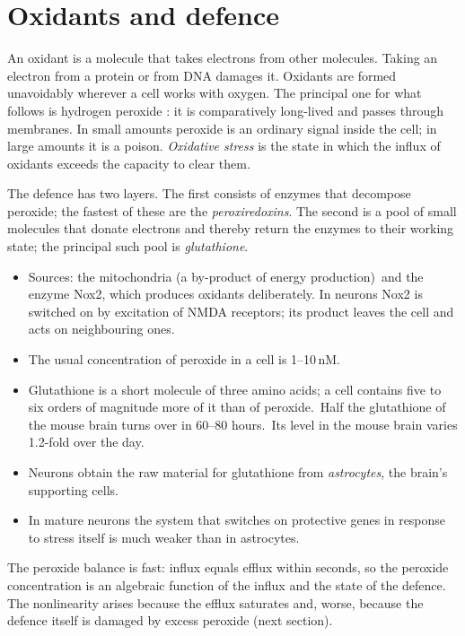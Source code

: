 \section{Oxidants and defence}\label{sec:redox}
An oxidant is a molecule that takes electrons from other molecules. Taking an electron from a protein or from DNA damages it. Oxidants are formed unavoidably wherever a cell works with oxygen. The principal one for what follows is hydrogen peroxide \Hp: it is comparatively long-lived and passes through membranes. In small amounts peroxide is an ordinary signal inside the cell; in large amounts it is a poison. \emph{Oxidative stress} is the state in which the influx of oxidants exceeds the capacity to clear them.

The defence has two layers. The first consists of enzymes that decompose peroxide; the fastest of these are the \emph{peroxiredoxins}. The second is a pool of small molecules that donate electrons and thereby return the enzymes to their working state; the principal such pool is \emph{glutathione}.
\facts
\begin{itemize}
\item Sources: the mitochondria (a by-product of energy production)\tU\ and the enzyme Nox2, which produces oxidants deliberately. In neurons Nox2 is switched on by excitation of NMDA receptors; its product leaves the cell and acts on neighbouring ones.\tS
\item The usual concentration of peroxide in a cell is 1--10\,nM.\tS
\item Glutathione is a short molecule of three amino acids; a cell contains five to six orders of magnitude more of it than of peroxide.\tU\ Half the glutathione of the mouse brain turns over in 60--80 hours.\tP\ Its level in the mouse brain varies 1.2-fold over the day.\tS
\item Neurons obtain the raw material for glutathione from \emph{astrocytes}, the brain's supporting cells.\tU
\item In mature neurons the system that switches on protective genes in response to stress itself is much weaker than in astrocytes.\tS
\end{itemize}
\begin{ineq}
The peroxide balance is fast: influx equals efflux within seconds, so the peroxide concentration is an algebraic function of the influx and the state of the defence. The nonlinearity arises because the efflux saturates and, worse, because the defence itself is damaged by excess peroxide (next section).
\end{ineq}
